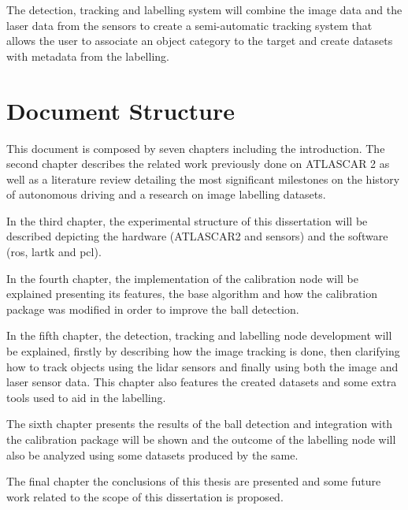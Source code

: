 The detection, tracking and labelling system will combine the image data and the laser data from the sensors to create a semi-automatic tracking system that allows the user to associate an object category to the target and create datasets with metadata from the labelling.


\section{Document Structure}

This document is composed by seven chapters including the introduction. The second chapter describes the related work previously done on ATLASCAR 2 as well as a literature review detailing the most significant milestones on the history of autonomous driving and a research on image labelling datasets. 

In the third chapter, the experimental structure of this dissertation will be described depicting the hardware (ATLASCAR2 and sensors) and the software (\gls{ros}, \gls{lartk} and \gls{pcl}). 

In the fourth chapter, the implementation of the calibration node will be explained presenting its features, the base algorithm and how the calibration package was modified in order to improve the ball detection. 

In the fifth chapter, the detection, tracking and labelling node development will be explained, firstly by describing how the image tracking is done, then clarifying how to track objects using the \gls{lidar} sensors and finally using both the image and laser sensor data. This chapter also features the created datasets and some extra tools used to aid in the labelling. 

The sixth chapter presents the results of the ball detection and integration with the calibration package will be shown and the outcome of the labelling node will also be analyzed using some datasets produced by the same. 

The final chapter the conclusions of this thesis are presented and some future work related to the scope of this dissertation is proposed.

